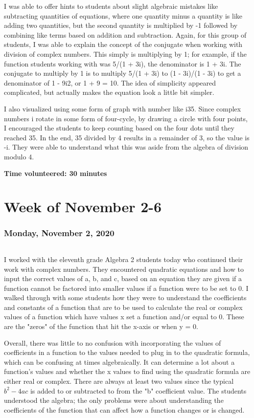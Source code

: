 \documentclass{article}
\begin{document}
I was able to offer hints to students about slight algebraic mistakes like subtracting quantities of equations, where one quantity minus a quantity is like adding two quantities, but the second quantity is multiplied by -1 followed by combining like terms based on addition and subtraction. Again, for this group of students, I was able to explain the concept of the conjugate when working with division of complex numbers. This simply is multiplying by 1; for example, if the function students working with was 5/(1 + 3i), the denominator is 1 + 3i. The conjugate to multiply by 1 is to multiply 5/(1 + 3i) to (1 - 3i)/(1 - 3i) to get a denominator of 1 - 9i2, or 1 + 9 = 10. The idea of simplicity appeared complicated, but actually makes the equation look a little bit simpler. 

I also visualized using some form of graph with number like i35. Since complex numbers i rotate in some form of four-cycle, by drawing a circle with four points, I encouraged the students to keep counting based on the four dots until they reached 35. In the end, 35 divided by 4 results in a remainder of 3, so the value is -i. They were able to understand what this was aside from the algebra of division modulo 4. 


\textbf{Time volunteered: 30 minutes}

\part{Week of November 2-6}
\section{Monday, November 2, 2020}
\paragraph{}I worked with the eleventh grade Algebra 2 students today who continued their work with complex numbers. They encountered quadratic equations and how to input the correct values of a, b, and c, based on an equation they are given if a function cannot be factored into smaller values if a function were to be set to 0. I walked through with some students how they were to understand the coefficients and constants of a function that are to be used to calculate the real or complex values of a function which have values x set a function and/or equal to 0. These are the "zeros" of the function that hit the x-axis or when y = 0. 

Overall, there was little to no confusion with incorporating the values of coefficients in a function to the values needed to plug in to the quadratic formula, which can be confusing at times algebraically. It can determine a lot about a function's values and whether the x values to find using the quadratic formula are either real or complex. There are always at least two values since the typical $b^2 - 4ac$ is added to or subtracted to from the "b" coefficient value. The students understood the algebra; the only problems were about understanding the coefficients of the function that can affect how a function changes or is changed. 
\end{document}
